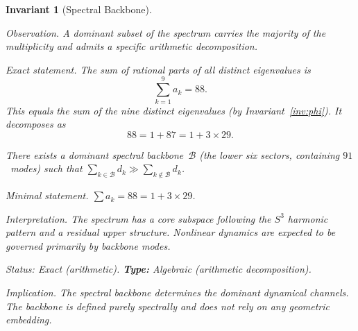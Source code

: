\documentclass[12pt,a4paper]{article}
\newtheorem{invariant}{Invariant}
\begin{document}
\begin{invariant}[Spectral Backbone]\label{inv:backbone}

\emph{Observation.}
A dominant subset of the spectrum carries the majority of the
multiplicity and admits a specific arithmetic decomposition.

\emph{Exact statement.}
The sum of rational parts of all distinct eigenvalues is
\begin{equation}\label{eq:backbone}
  \sum_{k=1}^{9} a_k = 88.
\end{equation}
This equals the sum of the nine distinct eigenvalues (by
Invariant~\ref{inv:phi}).  It decomposes as
\begin{equation}\label{eq:87}
  88 = 1 + 87 = 1 + 3 \times 29.
\end{equation}

There exists a dominant spectral backbone~$\mathcal{B}$ (the lower
six sectors, containing $91$~modes) such that
$\sum_{k \in \mathcal{B}} d_k \gg
 \sum_{k \notin \mathcal{B}} d_k$.

\emph{Minimal statement.}
$\sum a_k = 88 = 1 + 3 \times 29$.

\emph{Interpretation.}
The spectrum has a core subspace following the $S^3$ harmonic pattern
and a residual upper structure.  Nonlinear dynamics are expected to be
governed primarily by backbone modes.

\emph{Status:} Exact (arithmetic). \quad
\textbf{Type:} Algebraic (arithmetic decomposition).

\emph{Implication.}
The spectral backbone determines the dominant dynamical channels.
The backbone is defined purely spectrally and does not rely on any
geometric embedding.
\end{invariant}
\end{document}
